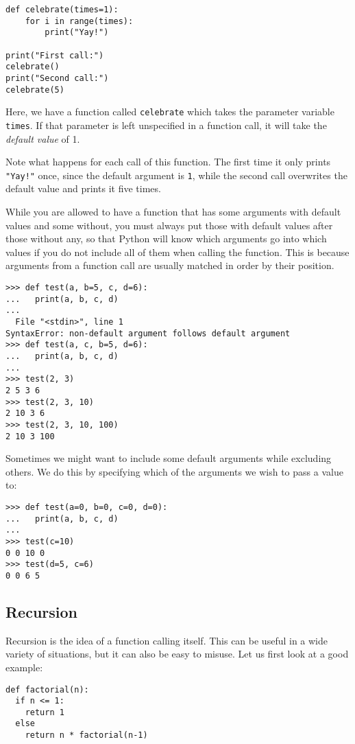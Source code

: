 \documentclass[11pt]{cselabheader}
\begin{document}
\begin{lstlisting}[style=python]
def celebrate(times=1):
    for i in range(times):
        print("Yay!")

print("First call:")
celebrate()
print("Second call:")
celebrate(5)
\end{lstlisting}

Here, we have a function called \lstinline!celebrate! which takes the parameter
variable \lstinline!times!. If that parameter is left unspecified in a function
call, it will take the \emph{default value} of 1.

Note what happens for each call of this function. The first time it only prints
\lstinline{"Yay!"} once, since the default argument is \lstinline{1}, while the
second call overwrites the default value and prints it five times.

While you are allowed to have a function that has some arguments with default
values and some without, you must always put those with default values after
those without any, so that Python will know which arguments go into which values
if you do not include all of them when calling the function. This is because
arguments from a function call are usually matched in order by their position.

\begin{lstlisting}[style=ipython]
>>> def test(a, b=5, c, d=6):
...   print(a, b, c, d)
... 
  File "<stdin>", line 1
SyntaxError: non-default argument follows default argument
>>> def test(a, c, b=5, d=6):
...   print(a, b, c, d)
... 
>>> test(2, 3)
2 5 3 6
>>> test(2, 3, 10)
2 10 3 6
>>> test(2, 3, 10, 100)
2 10 3 100
\end{lstlisting}

Sometimes we might want to include some default arguments while excluding
others. We do this by specifying which of the arguments we wish to pass a value
to:

\begin{lstlisting}[style=ipython]
>>> def test(a=0, b=0, c=0, d=0):
...   print(a, b, c, d)
... 
>>> test(c=10)
0 0 10 0
>>> test(d=5, c=6)
0 0 6 5
\end{lstlisting}

\subsection{Recursion}
\label{subsec:recur}
Recursion is the idea of a function calling itself. This can be useful in a wide
variety of situations, but it can also be easy to misuse. Let us first look at a
good example:
\begin{lstlisting}[style=python]
def factorial(n):
  if n <= 1:
    return 1
  else
    return n * factorial(n-1)
\end{lstlisting}
\end{document}
